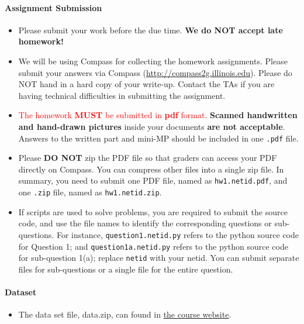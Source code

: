 \paragraph*{Assignment Submission}
\begin{itemize}
\setlength{\itemsep}{2pt}
\item Please submit your work before the due time. \textbf{We do NOT accept late homework!}
\item {We will be using Compass for collecting the homework assignments}. Please submit your answers via Compass (\url{http://compass2g.illinois.edu}). Please do NOT hand in a hard copy of your write-up. Contact the TAs if you are having technical difficulties in submitting the assignment.
\item \textcolor{red}{The homework \textbf{MUST} be submitted in \textbf{pdf} format}. \textbf{Scanned handwritten and hand-drawn pictures} inside your documents \textbf{are not acceptable}. Answers to the written part and mini-MP should be included in one \texttt{.pdf}  file.
\item Please \textbf{DO NOT} zip the PDF file so that graders can access your PDF directly on Compass.  You can compress other files into a single zip file. In summary, you need to submit one PDF file, named as \texttt{hw1.netid.pdf}, and one \texttt{.zip} file, named as \texttt{hw1.netid.zip}.
\item If scripts are used to solve problems, you are required to submit the source code, and use the file names to identify the corresponding questions or sub-questions. For instance, \texttt{question1.netid.py} refers to the python source code for Question 1; and \texttt{question1a.netid.py} refers to the python source code for sub-question 1(a); replace \texttt{netid} with your netid. You can submit separate files for sub-questions or a single file for the entire question. 

\end{itemize}


\paragraph*{Dataset}
\begin{itemize}
\item The data set file, data.zip, can found in  \href{https://wiki.cites.illinois.edu/wiki/display/cs412fa15/Assignments}{the course website}.    
\end{itemize}

